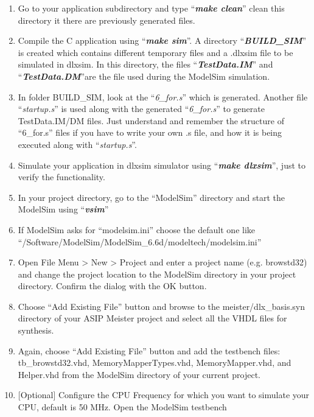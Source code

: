 \documentclass[
]{article}
\begin{document}
\begin{enumerate}
  \begin{enumerate}
  \def\labelenumii{\arabic{enumii}.}
  \item
    Go to your application subdirectory and type ``\emph{\textbf{make
    clean}}'' clean this directory it there are previously generated
    files.
  \item
    Compile the C application using ``\emph{\textbf{make sim}}''. A
    directory ``\emph{\textbf{BUILD\_SIM}}'' is created which contains
    different temporary files and a .dlxsim file to be simulated in
    dlxsim. In this directory, the files ``\emph{\textbf{TestData.IM}}''
    and ``\emph{\textbf{TestData.DM}}''are the file used during the
    ModelSim simulation.
  \item
    In folder BUILD\_SIM, look at the ``\emph{6\_for.s}'' which is
    generated. Another file ``\emph{startup.s}'' is used along with the
    generated ``\emph{6\_for.s}'' to generate TestData.IM/DM files. Just
    understand and remember the structure of ``6\_for.s'' files if you
    have to write your own .s file, and how it is being executed along
    with ``\emph{startup.s}''.
  \item
    Simulate your application in dlxsim simulator using
    ``\emph{\textbf{make dlxsim}}'', just to verify the functionality.
  \item
    In your project directory, go to the ``ModelSim'' directory and
    start the ModelSim using ``\emph{\textbf{vsim}}''
  \item
    If ModelSim asks for ``modelsim.ini'' choose the default one like
    ``/Software/ModelSim/ModelSim\_6.6d/modeltech/modelsim.ini''
  \item
    Open File Menu \textgreater{} New \textgreater{} Project and enter a
    project name (e.g. browstd32) and change the project location to the
    ModelSim directory in your project directory. Confirm the dialog
    with the OK button.
  \item
    Choose ``Add Existing File'' button and browse to the
    meister/dlx\_basis.syn directory of your ASIP Meister project and
    select all the VHDL files for synthesis.
  \item
    Again, choose ``Add Existing File'' button and add the testbench
    files: tb\_browstd32.vhd, MemoryMapperTypes.vhd, MemoryMapper.vhd,
    and Helper.vhd from the ModelSim directory of your current project.
  \item
    {[}Optional{]} Configure the CPU Frequency for which you want to
    simulate your CPU, default is 50 MHz. Open the ModelSim testbench

\end{enumerate}
\end{enumerate}
\end{document}
